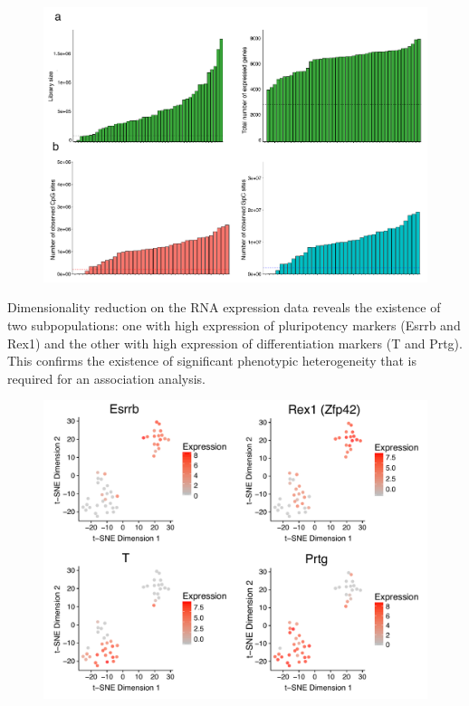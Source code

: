 \begin{figure}[H]
	\centering
	\includegraphics[width=0.8\linewidth]{scNMT_EB_QC}
	\caption[]{}
	\label{fig:scnmt_eb_qc}
\end{figure}


Dimensionality reduction on the RNA expression data reveals the existence of two subpopulations: one with high expression of pluripotency markers (Esrrb and Rex1) and the other with high expression of differentiation markers (T and Prtg). This confirms the existence of significant phenotypic heterogeneity that is required for an association analysis.

\begin{figure}[H]
	\centering
	\includegraphics[width=0.8\linewidth]{scNMT_EB_RNA}
	\caption[]{}
	\label{fig:scnmt_eb_rna}
\end{figure}

